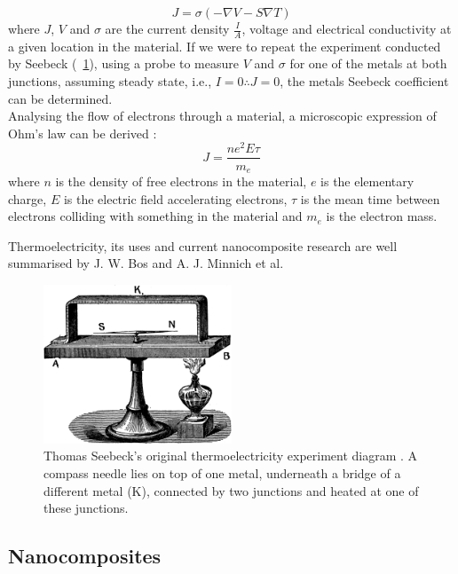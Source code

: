 \documentclass[a4paper,10pt,journal]{IEEEtran}
\newcommand{\figref}[2][\figurename~]{#1\ref{#2}}
\begin{document}
\begin{equation}
\label{current-density}
	J = \sigma (-\nabla V - S \nabla T)
\end{equation}
where $J$, $V$ and $\sigma$ are the current density $\frac{I}{A}$,
voltage and electrical conductivity at a given location in the
material. If we were to repeat the experiment conducted by Seebeck
(\figref{seebeck-experiment}), using a probe to measure $V$ and
$\sigma$ for one of the metals at both junctions, assuming steady state,
i.e., $I=0 \therefore J = 0$, the metals Seebeck coefficient can be
determined.\\
Analysing the flow of electrons through a material, a microscopic
expression of Ohm's law can be derived \cite{kittel}:
\begin{equation}
\label{micro-ohm}
	J = \frac{ne^2E \tau}{m_e}
\end{equation}
where $n$ is the density of free electrons in the material, $e$ is the
elementary charge, $E$ is the electric field accelerating
electrons, $\tau$ is the mean time between electrons colliding with
something in the material and $m_e$ is the electron mass.

Thermoelectricity, its uses and current nanocomposite research are well
summarised by J. W. Bos \cite{bos-review} and A. J. Minnich et al.
\cite{minnich-review}

\begin{figure}
	\centering
	\includegraphics[width=0.5\textwidth]{seebeck-experiment-black.png}
	\caption{Thomas Seebeck's original thermoelectricity experiment
	diagram \cite{seebeck-original}. A compass needle lies on top of
	one metal, underneath a bridge of a different metal (K), connected
	by two junctions and heated at one of these junctions.}
	\label{seebeck-experiment}
\end{figure}



\subsection{Nanocomposites}
\end{document}
